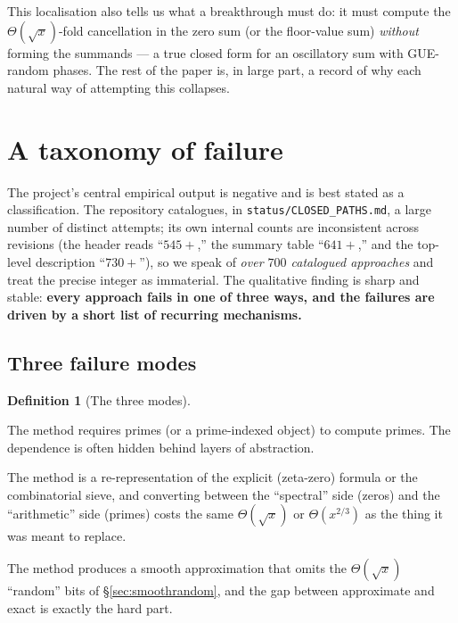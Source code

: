 \documentclass[11pt]{article}
\theoremstyle{plain}
\theoremstyle{definition}
\newtheorem{definition}[theorem]{Definition}
\theoremstyle{remark}
\begin{document}
This localisation also tells us what a breakthrough must do: it must compute the
$\Theta(\sqrt{x})$-fold cancellation in the zero sum (or the floor-value sum)
\emph{without} forming the summands --- a true closed form for an oscillatory
sum with GUE-random phases. The rest of the paper is, in large part, a record of
why each natural way of attempting this collapses.

\section{A taxonomy of failure}
\label{sec:taxonomy}

The project's central empirical output is negative and is best stated as a
classification. The repository catalogues, in
\texttt{status/CLOSED\_PATHS.md}, a large number of distinct attempts; its own
internal counts are inconsistent across revisions (the header reads ``$545{+}$,''
the summary table ``$641{+}$,'' and the top-level description ``$730{+}$''), so we
speak of \emph{over $700$ catalogued approaches} and treat the precise integer as
immaterial. The qualitative finding is sharp and stable: \textbf{every approach
fails in one of three ways, and the failures are driven by a short list of
recurring mechanisms.}

\subsection{Three failure modes}

\begin{definition}[The three modes]\label{def:modes}
\leavevmode
\begin{description}[leftmargin=2.2em,itemsep=2pt]
\item[\textnormal{(C) Circularity.}] The method requires primes (or a prime-indexed
object) to compute primes. The dependence is often hidden behind layers of
abstraction.
\item[\textnormal{(E) Equivalence.}] The method is a re-representation of the
explicit (zeta-zero) formula or the combinatorial sieve, and converting between
the ``spectral'' side (zeros) and the ``arithmetic'' side (primes) costs the same
$\Theta(\sqrt{x})$ or $\Theta(x^{2/3})$ as the thing it was meant to replace.
\item[\textnormal{(I) Information loss.}] The method produces a smooth
approximation that omits the $\Theta(\sqrt{x})$ ``random'' bits of
\S\ref{sec:smoothrandom}, and the gap between approximate and exact is exactly
the hard part.
\end{description}
\end{definition}
\end{document}
